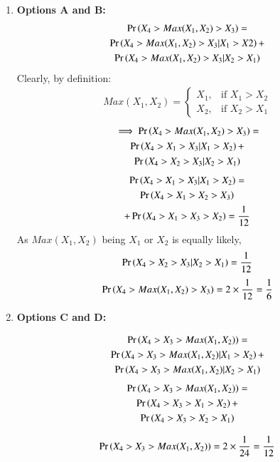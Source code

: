 \documentclass[journal,12pt,twocolumn]{IEEEtran}
\begin{document}
\begin{enumerate}
    \item \textbf{Options A and B:}
\begin{multline}
    \Pr\left(X_4 > Max(X_1,X_2) > X_3\right) = \\\Pr\left(X_4 > Max(X_1,X_2) > X_3 | X_1>X2 \right) + \\ \Pr\left(X_4 > Max(X_1,X_2) > X_3 | X_2>X_1 \right)
\end{multline}
Clearly, by definition:
\begin{align}
  Max(X_1,X_2) = 
  \begin{cases}
      X_1, & \text{if } X_1>X_2\\
    X_2, & \text{if } X_2>X_1
  \end{cases}
\end{align}
\begin{multline}
    \implies \Pr\left(X_4 > Max(X_1,X_2) > X_3\right) = \\\Pr\left(X_4 > X_1 > X_3| X_1 > X_2 \right) + \\ \Pr\left(X_4 > X_2 > X_3| X_2 > X_1\right)
\end{multline}
\begin{multline}
    \Pr\left(X_4 > X_1 > X_3 | X_1 > X_2 \right) = \\\Pr\left(X_4 > X_1 > X_2> X_3\right) \\+\Pr\left(X_4 > X_1 > X_3 > X_2\right)
= \frac{1}{12}
\end{multline}
As $Max(X_1,X_2)$ being $X_1$ or $X_2$ is equally likely,
\begin{align}
\Pr\left(X_4 > X_2 > X_3| X_2 > X_1\right) = \frac{1}{12}
\end{align}
\begin{align}
\Pr\left(X_4 > Max(X_1,X_2) > X_3\right) = 2 \times \frac{1}{12} = \frac{1}{6}
\end{align}

\item \textbf{Options C and D:} 

\begin{multline}
    \Pr\left(X_4 > X_3 > Max(X_1,X_2)\right) = \\\Pr\left(X_4 > X_3 > Max(X_1,X_2)| X_1>X_2\right) + \\\Pr\left(X_4 > X_3 > Max(X_1,X_2)| X_2>X_1\right)
\end{multline}
\begin{multline}
    \Pr\left(X_4 > X_3 > Max(X_1,X_2)\right) = \\\Pr\left(X_4 > X_3 > X_1 > X_2\right) + \\\Pr\left(X_4 > X_3 > X_2 > X_1\right)
\end{multline}  

\begin{align}
    \Pr\left(X_4 > X_3 > Max(X_1,X_2)\right) = 2 \times \frac{1}{24} = \frac{1}{12}
\end{align}
\end{enumerate}

\bigskip
{}
\end{document}
